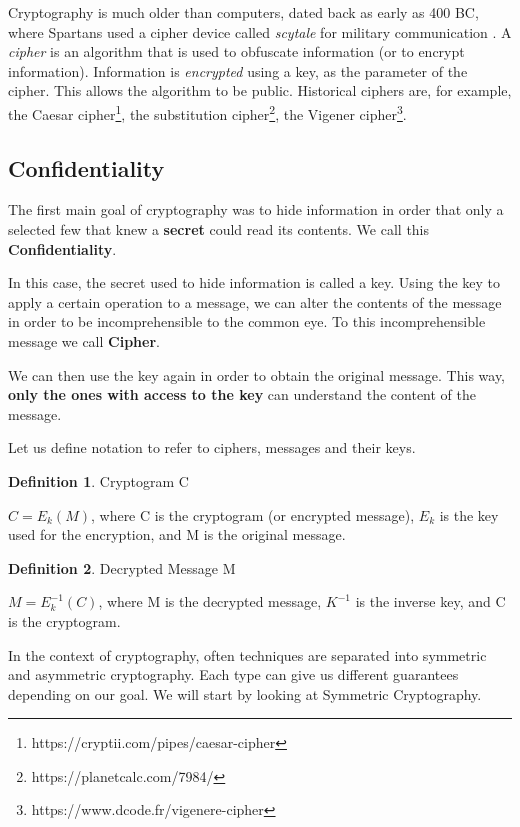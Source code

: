 \documentclass[12pt,a4paper]{article}
\theoremstyle{definition}
\newtheorem{definition}{Definition}[section]
\begin{document}
Cryptography is much older than computers, dated back as early as 400 BC, where Spartans used a cipher device called \emph{scytale} for military communication \cite{simmons}. A \emph{cipher} is an algorithm that is used to obfuscate information (or to encrypt information). Information is \emph{encrypted} using a key, as the parameter of the cipher. This allows the algorithm to be public. Historical ciphers are, for example, the Caesar cipher\footnote{https://cryptii.com/pipes/caesar-cipher}, the substitution cipher\footnote{https://planetcalc.com/7984/}, the Vigener cipher\footnote{https://www.dcode.fr/vigenere-cipher}. 



\subsection{Confidentiality}

The first main goal of cryptography was to hide information in order that only a selected few that knew a \textbf{secret} could read its contents. We call this \textbf{Confidentiality}. %

In this case, the secret used to hide information is called a key. Using the key to apply a certain operation to a message, we can alter the contents of the message in order to be incomprehensible to the common eye. To this incomprehensible message we call \textbf{Cipher}. 

We can then use the key again in order to obtain the original message. This way, \textbf{only the ones with access to the key} can understand the content of the message.

Let us define notation to refer to ciphers, messages and their keys.

\theoremstyle{definition}
\begin{definition}{Cryptogram C}

$C = E_k(M)$, where C is the cryptogram (or encrypted message), $E_k$ is the key used for the encryption, and M is the original message. 
\end{definition}

\begin{definition}{Decrypted Message M}

$M = E_k^{-1}(C)$, where M is the decrypted message, $K^{-1}$ is the inverse key, and C is the cryptogram. 
\end{definition}

In the context of cryptography, often techniques are separated into symmetric and asymmetric cryptography. Each type can give us different guarantees depending on our goal. We will start by looking at Symmetric Cryptography.
\end{document}
